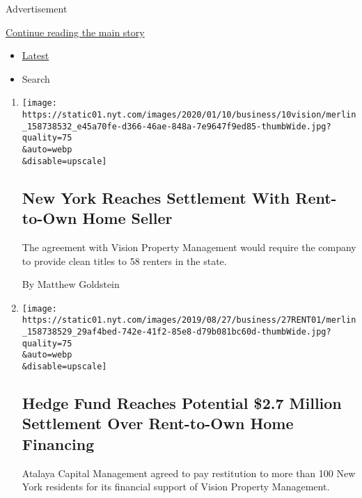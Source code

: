 Advertisement

\protect\hyperlink{after-mid1}{Continue reading the main story}

\begin{itemize}
\tightlist
\item
  \protect\hyperlink{stream-panel}{Latest}
\item
  Search
\end{itemize}

\begin{enumerate}
\def\labelenumi{\arabic{enumi}.}
\item
  \href{/2020/01/10/business/rent-to-own-vision-property-management.html}{}

  \texttt{[image: https://static01.nyt.com/images/2020/01/10/business/10vision/merlin\_158738532\_e45a70fe-d366-46ae-848a-7e9647f9ed85-thumbWide.jpg?quality=75\\\&auto=webp\\\&disable=upscale]}

  \hypertarget{new-york-reaches-settlement-with-rent-to-own-home-seller}{%
  \subsection{New York Reaches Settlement With Rent-to-Own Home
  Seller}\label{new-york-reaches-settlement-with-rent-to-own-home-seller}}

  The agreement with Vision Property Management would require the
  company to provide clean titles to 58 renters in the state.

  By Matthew Goldstein
\item
  \href{/2019/08/27/business/rent-to-own-homes-hedge-fund-atalaya.html}{}

  \texttt{[image: https://static01.nyt.com/images/2019/08/27/business/27RENT01/merlin\_158738529\_29af4bed-742e-41f2-85e8-d79b081bc60d-thumbWide.jpg?quality=75\\\&auto=webp\\\&disable=upscale]}

  \hypertarget{hedge-fund-reaches-potential-27-million-settlement-over-rent-to-own-home-financing}{%
  \subsection{Hedge Fund Reaches Potential \$2.7 Million Settlement Over
  Rent-to-Own Home
  Financing}\label{hedge-fund-reaches-potential-27-million-settlement-over-rent-to-own-home-financing}}

  Atalaya Capital Management agreed to pay restitution to more than 100
  New York residents for its financial support of Vision Property
  Management.


\end{enumerate}
